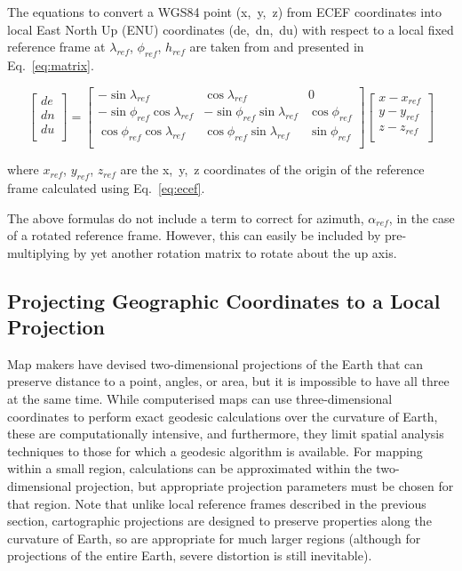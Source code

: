 The equations to convert a WGS84 point (x,~y,~z) from ECEF coordinates
into local East North Up (ENU) coordinates (de,~dn,~du) with respect to
a local fixed reference frame at \(\lambda_{ref}\), \(\phi_{ref}\),
\(h_{ref}\) are taken from \cite{drake_converting_2002} and presented in Eq.~\ref{eq:matrix}.

\begin{equation} \label{eq:matrix}
\left[
\begin{matrix}
de\\
dn\\
du\\
\end{matrix}
\right]=\left[
\begin{matrix}
-\sin{\lambda_{ref}}&\cos{\lambda_{ref}}&0\\
-\sin{\phi_{ref}}\cos{\lambda_{ref}}&-\sin{\phi_{ref}}\sin{\lambda_{ref}}&\cos{\phi_{ref}}\\
\cos{\phi_{ref}\cos{\lambda_{ref}}}&\cos{\phi_{ref}\sin{\lambda_{ref}}}&\sin{\phi_{ref}}\\
\end{matrix}
\right]
\left[
\begin{matrix}
x-x_{ref}\\
y-y_{ref}\\
z-z_{ref}\\
\end{matrix}
\right]
\end{equation}


where \(x_{ref}\), \(y_{ref}\), \(z_{ref}\) are the x,~y,~z coordinates of
the origin of the reference frame calculated using Eq.~\ref{eq:ecef}.

The above formulas do not include a term to correct for azimuth,
\(\alpha_{ref}\), in the case of a rotated reference frame. However,
this can easily be included by pre-multiplying by yet another rotation
matrix to rotate about the up axis.

\subsection{Projecting Geographic Coordinates to a Local
Projection}\label{projecting-geographic-coordinates-to-a-local-projection}

Map makers have devised two-dimensional projections of the Earth that can preserve
distance to a point, angles, or area, but it is impossible to have all
three at the same time. While computerised maps can use three-dimensional coordinates to perform exact geodesic calculations over the curvature of Earth,
these are computationally intensive, and furthermore, they limit spatial
analysis techniques to those for which a geodesic algorithm is
available. For mapping within a small region, calculations can be approximated within the two-dimensional projection,
but appropriate projection parameters must be chosen for that region. Note
that unlike local reference frames described in the previous section,
cartographic projections are designed to preserve properties along the
curvature of Earth, so are appropriate for much larger regions (although
for projections of the entire Earth, severe distortion is still
inevitable).

